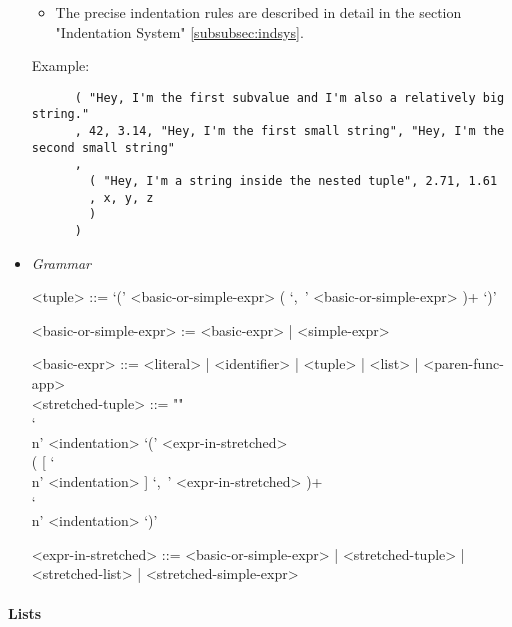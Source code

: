 \documentclass{article}
\begin{document}
\begin{itemize}
\begin{itemize}
\item
The precise indentation rules are described in detail in the section
"Indentation System" \ref{subsubsec:indsys}.
\end{itemize}
Example:
\begin{verbatim}
      ( "Hey, I'm the first subvalue and I'm also a relatively big string."
      , 42, 3.14, "Hey, I'm the first small string", "Hey, I'm the second small string"
      ,
        ( "Hey, I'm a string inside the nested tuple", 2.71, 1.61
        , x, y, z
        )
      )
\end{verbatim}

\item \textit{Grammar}
\begin{grammar}
<tuple> ::=
`(' <basic-or-simple-expr> ( `,\ ' <basic-or-simple-expr> )+ `)'

<basic-or-simple-expr> := <basic-expr> | <simple-expr>

<basic-expr> ::= <literal> | <identifier> | <tuple> | <list> | <paren-func-app>\\

<stretched-tuple> ::= ""\\
`\\n' <indentation> `(' <expr-in-stretched> \\
( [ `\\n' <indentation> ] `,\ ' <expr-in-stretched> )+ \\
`\\n' <indentation> `)'

<expr-in-stretched> ::=
<basic-or-simple-expr> | <stretched-tuple> | <stretched-list> |
<stretched-simple-expr>
\end{grammar}

\end{itemize}

\paragraph{Lists}
\end{document}
